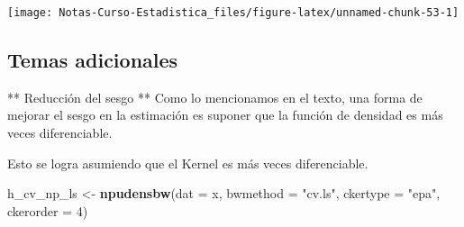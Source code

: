 \documentclass[
  12pt,
]{book}
\newenvironment{Shaded}{\begin{snugshade}}{\end{snugshade}}
\newcommand{\DataTypeTok}[1]{\textcolor[rgb]{0.13,0.29,0.53}{#1}}
\newcommand{\DecValTok}[1]{\textcolor[rgb]{0.00,0.00,0.81}{#1}}
\newcommand{\KeywordTok}[1]{\textcolor[rgb]{0.13,0.29,0.53}{\textbf{#1}}}
\newcommand{\NormalTok}[1]{#1}
\newcommand{\OperatorTok}[1]{\textcolor[rgb]{0.81,0.36,0.00}{\textbf{#1}}}
\newcommand{\StringTok}[1]{\textcolor[rgb]{0.31,0.60,0.02}{#1}}
\theoremstyle{definition}
\theoremstyle{definition}
\theoremstyle{definition}
\theoremstyle{remark}
\begin{document}
\begin{Shaded}
\end{Shaded}

\begin{center}\texttt{[image: Notas-Curso-Estadistica\_files/figure-latex/unnamed-chunk-53-1]} \end{center}

\hypertarget{temas-adicionales}{%
\subsection{Temas adicionales}\label{temas-adicionales}}

** Reducción del sesgo **
Como lo mencionamos en el texto, una forma de mejorar el sesgo en la estimación es suponer que la función de densidad es más veces diferenciable.

Esto se logra asumiendo que el Kernel es más veces diferenciable.

\begin{Shaded}
\begin{Highlighting}[]
\NormalTok{h_cv_np_ls <-}\StringTok{ }\KeywordTok{npudensbw}\NormalTok{(}\DataTypeTok{dat =}\NormalTok{ x, }\DataTypeTok{bwmethod =} \StringTok{"cv.ls"}\NormalTok{, }
    \DataTypeTok{ckertype =} \StringTok{"epa"}\NormalTok{, }\DataTypeTok{ckerorder =} \DecValTok{4}\NormalTok{)}
\end{Highlighting}
\end{Shaded}
\end{document}
